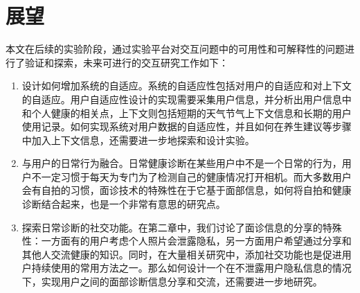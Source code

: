 \section{展望}
本文在后续的实验阶段，通过实验平台对交互问题中的可用性和可解释性的问题进行了验证和探索，未来可进行的交互研究工作如下：

\begin{enumerate}
	\item 设计如何增加系统的自适应。系统的自适应性包括对用户的自适应和对上下文的自适应。用户自适应性设计的实现需要采集用户信息，并分析出用户信息中和个人健康的相关点，上下文则包括短期的天气节气上下文信息和长期的用户使用记录。如何实现系统对用户数据的自适应性，并且如何在养生建议等步骤中加入上下文信息，还需要进一步地探索和设计实验。

	\item 与用户的日常行为融合。日常健康诊断在某些用户中不是一个日常的行为，用户不一定习惯于每天为专门为了检测自己的健康情况打开相机。而大多数用户会有自拍的习惯，面诊技术的特殊性在于它基于面部信息，如何将自拍和健康诊断结合起来，也是一个非常有意思的研究点。

	\item 探索日常诊断的社交功能。在第二章中，我们讨论了面诊信息的分享的特殊性：一方面有的用户考虑个人照片会泄露隐私，另一方面用户希望通过分享和其他人交流健康的知识。同时，在大量相关研究中，添加社交功能也是促进用户持续使用的常用方法之一。那么如何设计一个在不泄露用户隐私信息的情况下，实现用户之间的面部诊断信息分享和交流，还需要进一步地研究。
	
\end{enumerate}